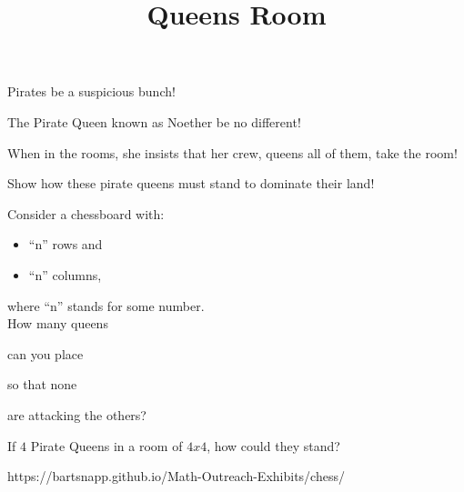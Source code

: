 \documentclass{../exhibit}
\title{Queens Room}
\begin{document}
\begin{context}
  Pirates be a suspicious bunch!


  The Pirate Queen known as Noether be no different!


  When in the rooms, she insists that her crew, queens all of them, take the room!

    
  Show how these pirate queens must stand to dominate their land!
\end{context}



\begin{directions}
  Consider a chessboard with:
  \begin{itemize}
  \item ``n'' rows and
  \item ``n'' columns,
  \end{itemize}
  where ``n'' stands for some number.
  \\[1cm] How many queens

  can you place


  so that none


  are attacking the others?
\end{directions}



\begin{example}
 If $4$ Pirate Queens in a room of $4x4$, how could they stand?
\begin{center}
\end{center}
\end{example}



\begin{mathConnections}
  https://bartsnapp.github.io/Math-Outreach-Exhibits/chess/
\end{mathConnections}
\end{document}
